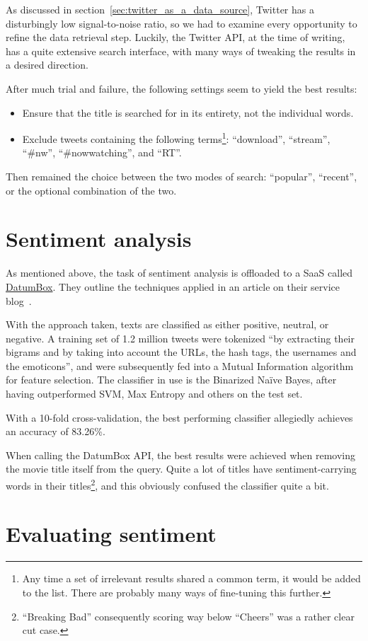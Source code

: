 As discussed in section~\ref{sec:twitter_as_a_data_source}, Twitter has a disturbingly low signal-to-noise ratio, so we had to examine every opportunity to refine the data retrieval step.
Luckily, the Twitter API, at the time of writing, has a quite extensive search interface, with many ways of tweaking the results in a desired direction.

After much trial and failure, the following settings seem to yield the best results:

\begin{itemize}
  \item Ensure that the title is searched for in its entirety, not the individual words.
  \item Exclude tweets containing the following terms\footnote{Any time a set of irrelevant results shared a common term, it would be added to the list. There are probably many ways of fine-tuning this further.}: ``download'', ``stream'', ``#nw'', ``#nowwatching'', and ``RT''.
\end{itemize}

Then remained the choice between the two modes of search: ``popular'', ``recent'', or the optional combination of the two.



\section{Sentiment analysis} %
\label{sec:sentiment_analysis}

As mentioned above, the task of sentiment analysis is offloaded to a SaaS called \url{DatumBox}. They outline the techniques applied in an article on their service blog~\cite{DatumBoxTwitterSentiment}.

With the approach taken, texts are classified as either positive, neutral, or negative.
A training set of 1.2 million tweets were tokenized ``by extracting their bigrams and by taking into account the URLs, the hash tags, the usernames and the emoticons'', and were subsequently fed into a Mutual Information algorithm for feature selection.
The classifier in use is the Binarized Naïve Bayes, after having outperformed SVM, Max Entropy and others on the test set.

With a 10-fold cross-validation, the best performing classifier allegiedly achieves an accuracy of 83.26\%.

When calling the DatumBox API, the best results were achieved when removing the movie title itself from the query.
Quite a lot of titles have sentiment-carrying words in their titles\footnote{``Breaking Bad'' consequently scoring way below ``Cheers'' was a rather clear cut case.}, and this obviously confused the classifier quite a bit.


\section{Evaluating sentiment} %
\label{sec:evaluating_sentiment}



